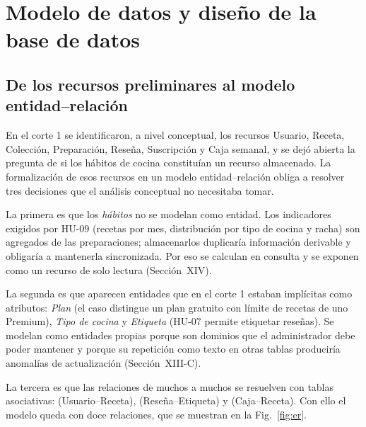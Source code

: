 
\section{Modelo de datos y diseño de la base de datos}

\subsection{De los recursos preliminares al modelo entidad--relación}
En el corte 1 se identificaron, a nivel conceptual, los recursos Usuario, Receta, Colección, Preparación, Reseña, Suscripción y Caja semanal, y se dejó abierta la pregunta de si los hábitos de cocina constituían un recurso almacenado. La formalización de esos recursos en un modelo entidad--relación obliga a resolver tres decisiones que el análisis conceptual no necesitaba tomar.

La primera es que los \emph{hábitos} no se modelan como entidad. Los indicadores exigidos por HU-09 (recetas por mes, distribución por tipo de cocina y racha) son agregados de las preparaciones; almacenarlos duplicaría información derivable y obligaría a mantenerla sincronizada. Por eso se calculan en consulta y se exponen como un recurso de solo lectura (Sección~XIV).

La segunda es que aparecen entidades que en el corte 1 estaban implícitas como atributos: \emph{Plan} (el caso distingue un plan gratuito con límite de recetas de uno Premium), \emph{Tipo de cocina} y \emph{Etiqueta} (HU-07 permite etiquetar reseñas). Se modelan como entidades propias porque son dominios que el administrador debe poder mantener y porque su repetición como texto en otras tablas produciría anomalías de actualización (Sección~XIII-C).

La tercera es que las relaciones de muchos a muchos se resuelven con tablas asociativas:  (Usuario--Receta),  (Reseña--Etiqueta) y  (Caja--Receta). Con ello el modelo queda con doce relaciones, que se muestran en la Fig.~\ref{fig:er}.

